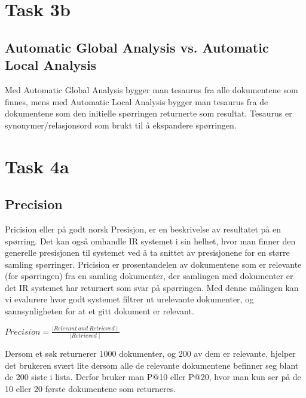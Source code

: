 \usepackage{mathtools}


\section*{Task 3b}

\vspace{3 mm}

\subsection*{Automatic Global Analysis vs. Automatic Local Analysis}
Med Automatic Global Analysis bygger man tesaurus fra alle dokumentene som finnes, mens med Automatic Local Analysis bygger man tesaurus fra de dokumentene som den initielle spørringen returnerte som resultat. Tesaurus er synonymer/relasjonsord som brukt til å ekspandere spørringen.

\vspace{6 mm}

\section*{Task 4a}

\vspace{3 mm}

\subsection*{Precision}
Pricision eller på godt norsk Presisjon, er en beskrivelse av resultatet på en spørring. Det kan også omhandle IR systemet i sin helhet, hvor man finner den generelle presisjonen til systemet ved å ta snittet av presisjonene for en større samling spørringer. Pricision er prosentandelen av dokumentene som er relevante (for spørringen) fra en samling dokumenter, der samlingen med dokumenter er det IR systemet har returnert som svar på spørringen. Med denne målingen kan vi evalurere hvor godt systemet filtrer ut urelevante dokumenter, og sannsynligheten for at et gitt dokument er relevant.

\vspace{3 mm}

\begin{center}
$Precision = \frac{\mid Relevant \ and \ Retrieved \mid}{\mid Retrieved \mid}$
\end{center}

\vspace{3 mm}

Dersom et søk returnerer 1000 dokumenter, og 200 av dem er relevante, hjelper det brukeren svært lite dersom alle de relevante dokumentene befinner seg blant de 200 siste i lista. Derfor bruker man P@10 eller P@20, hvor man kun ser på de 10 eller 20 første dokumentene som returneres.

